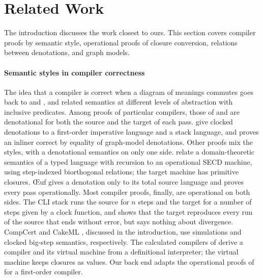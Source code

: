 
\section{Related Work}
\label{sec:related}

The introduction discusses the work closest to ours. This section covers
compiler proofs by semantic style, operational proofs of closure
conversion, relations between denotations, and graph models.

\paragraph{Semantic styles in compiler correctness}

The idea that a compiler is correct when a diagram of meanings
commutes goes back to \citet{Morris:1973ab} and
\citet{Thatcher:1981aa}, and \citet{Milne:1976aa} related semantics at
different levels of abstraction with inclusive predicates. Among
proofs of particular compilers, those of \citet{Pardo:2018aa} and
\citet{Siek:2017ab} are denotational for both the source and the
target of each pass.  \citet{Pardo:2018aa} give clocked denotations to
a first-order imperative language and a stack language, and
\citet{Siek:2017ab} proves an inliner correct by equality of
graph-model denotations. Other proofs mix the styles, with a
denotational semantics on only one side.  \citet{Benton:2009aa} relate
a domain-theoretic semantics of a typed language with recursion to an
operational SECD machine, using step-indexed biorthogonal relations;
the target machine has primitive closures. \OE{}uf
\citep{Mullen:2018aa} gives a denotation only to its total source
language and proves every pass operationally. Most compiler proofs,
finally, are operational on both sides. The CLI stack
\citep{Moore:1989aa,Young:1989aa} runs the source for $n$ steps and
the target for a number of steps given by a clock function, and shows
that the target reproduces every run of the source that ends without
error, but says nothing about divergence.  CompCert
\citep{Leroy:2009aa} and CakeML \citep{Kumar:2014aa}, discussed in the
introduction, use simulations and clocked big-step semantics,
respectively. The calculated compilers of \citet{Bahr:2015aa} derive a
compiler and its virtual machine from a definitional interpreter; the
virtual machine keeps closures as values.  Our back end adapts the
operational proofs of \citet{Siek:2025ab} for a first-order compiler.

